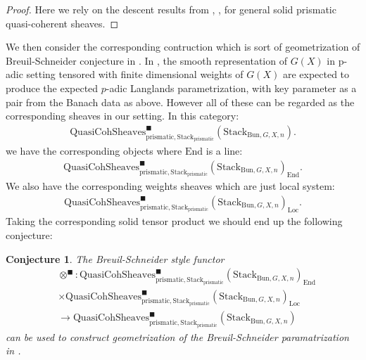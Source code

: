 \documentclass[12pt]{article}
\newtheorem{conjecture}{Conjecture}
\theoremstyle{definition}
\begin{document}
\begin{proof}
Here we rely on the descent results from \cite{CSA}, \cite{CSB}, \cite{CSC} for general solid prismatic quasi-coherent sheaves.
\end{proof}

\noindent We then consider the corresponding contruction which is sort of geometrization of Breuil-Schneider conjecture in \cite{BS}. In \cite{BS}, the smooth representation of $G(X)$ in p-adic setting tensored with finite dimensional weights of $G(X)$ are expected to produce the expected $p$-adic Langlands parametrization, with key parameter as a pair from the Banach data as above. However all of these can be regarded as the corresponding sheaves in our setting.
In this category:
\begin{align}
\mathrm{QuasiCohSheaves}^\blacksquare_{\mathrm{prismatic},\mathrm{Stack}_{\mathrm{prismatic}}}(\mathrm{Stack}_{\mathrm{Bun},G,X,n}).
\end{align}
we have the corresponding objects where $\mathrm{End}$ is a line:
\begin{align}
\mathrm{QuasiCohSheaves}^\blacksquare_{\mathrm{prismatic},\mathrm{Stack}_{\mathrm{prismatic}}}(\mathrm{Stack}_{\mathrm{Bun},G,X,n})_{\mathrm{End}}.
\end{align}
We also have the corresponding weights sheaves which are just local system:
\begin{align}
\mathrm{QuasiCohSheaves}^\blacksquare_{\mathrm{prismatic},\mathrm{Stack}_{\mathrm{prismatic}}}(\mathrm{Stack}_{\mathrm{Bun},G,X,n})_{\mathrm{Loc}}.
\end{align}
Taking the corresponding solid tensor product we should end up the following conjecture:
\begin{conjecture}
The Breuil-Schneider style functor 
\begin{align}
&\otimes^\blacksquare: \mathrm{QuasiCohSheaves}^\blacksquare_{\mathrm{prismatic},\mathrm{Stack}_{\mathrm{prismatic}}}(\mathrm{Stack}_{\mathrm{Bun},G,X,n})_{\mathrm{End}}\\
&\times \mathrm{QuasiCohSheaves}^\blacksquare_{\mathrm{prismatic},\mathrm{Stack}_{\mathrm{prismatic}}}(\mathrm{Stack}_{\mathrm{Bun},G,X,n})_{\mathrm{Loc}}\\
& \rightarrow \mathrm{QuasiCohSheaves}^\blacksquare_{\mathrm{prismatic},\mathrm{Stack}_{\mathrm{prismatic}}}(\mathrm{Stack}_{\mathrm{Bun},G,X,n})
\end{align}
can be used to construct geometrization of the Breuil-Schneider paramatrization in \cite{BS}.
\end{conjecture}
\end{document}

